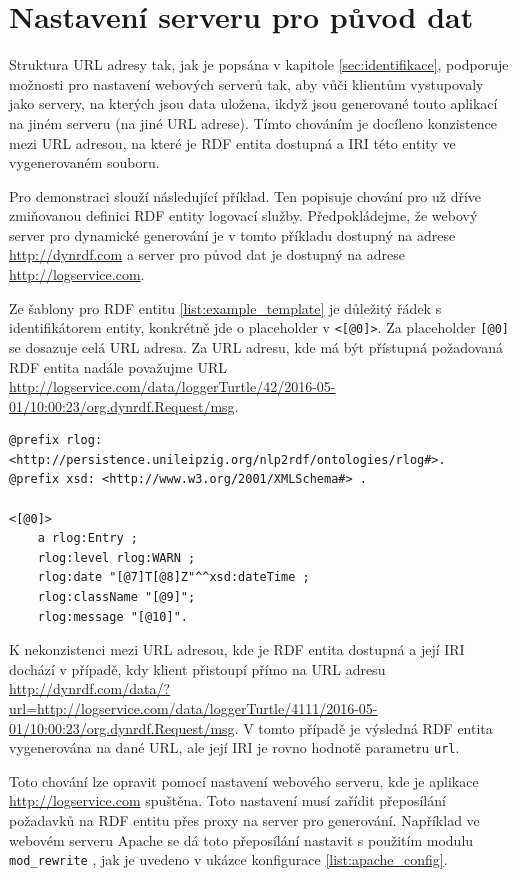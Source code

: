 \documentclass[thesis=B,czech]{FITthesis}[2012/06/26]
\begin{document}
  \section{Nastavení serveru pro původ dat}
  Struktura URL adresy tak, jak je popsána v kapitole \ref{sec:identifikace}, podporuje možnosti pro nastavení webových serverů tak, aby 
  vůči klientům vystupovaly jako servery, na kterých jsou data uložena, ikdyž jsou generované touto aplikací na jiném serveru (na jiné URL adrese). Tímto chováním je docíleno konzistence
  mezi URL adresou, na které je RDF entita dostupná a IRI této entity ve vygenerovaném souboru.
  
  Pro demonstraci slouží následující příklad. Ten popisuje chování pro už dříve zmiňovanou definici RDF entity logovací služby. Předpokládejme, že webový server
  pro dynamické generování je v tomto příkladu dostupný na adrese \url{http://dynrdf.com} a server pro původ dat je dostupný na adrese\\ 
  \url{http://logservice.com}. 
  
  Ze šablony pro RDF entitu \ref{list:example_template} je důležitý řádek s identifikátorem entity, 
  konkrétně jde o placeholder v \texttt{<[@0]>}. Za placeholder \texttt{[@0]} se dosazuje celá URL adresa. Za URL adresu, kde má být přístupná požadovaná RDF entita
  nadále považujme URL \url{http://logservice.com/data/loggerTurtle/42/2016-05-01/10:00:23/org.dynrdf.Request/msg}. 
  

\begin{lstlisting}[float=htb,caption={Šablona RDF entity v Turtle formátu},label=list:example_template]
@prefix rlog: 
<http://persistence.unileipzig.org/nlp2rdf/ontologies/rlog#>.
@prefix xsd: <http://www.w3.org/2001/XMLSchema#> .

<[@0]> 
	a rlog:Entry ;
  	rlog:level rlog:WARN ;
	rlog:date "[@7]T[@8]Z"^^xsd:dateTime ;
	rlog:className "[@9]";
	rlog:message "[@10]".
\end{lstlisting}
  
  K nekonzistenci mezi URL adresou, kde je RDF entita dostupná a její IRI dochází v případě, kdy klient přistoupí přímo na URL adresu 
  \url{http://dynrdf.com/data/?url=http://logservice.com/data/loggerTurtle/4111/2016-05-01/10:00:23/org.dynrdf.Request/msg}.
  V tomto případě je výsledná RDF entita vygenerována na dané URL, ale její IRI je rovno hodnotě parametru \texttt{url}.
  
  Toto chování lze opravit pomocí nastavení webového serveru, kde je aplikace \url{http://logservice.com} spuštěna.
  Toto nastavení musí zařídit přeposílání požadavků na RDF entitu přes proxy na server pro generování. 
  Například ve webovém serveru Apache \cite{apache_httpd} se dá toto přeposílání nastavit
  s použitím modulu \texttt{mod\_rewrite} \cite{mod_rewrite}, jak je uvedeno v ukázce konfigurace \ref{list:apache_config}.
  
\end{document}
